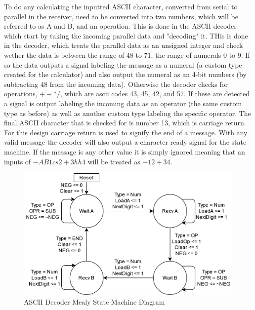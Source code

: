 \documentclass[11pt]{article}
\begin{document}
To do any calculating the inputted ASCII character, converted from serial to parallel in the receiver, need to be converted into two numbers, which will be referred to as A and B, and an operation.
This is done in the ASCII decoder which start by taking the incoming parallel data and "decoding" it.
THis is done in the decoder, which treats the parallel data as an unsigned integer and check wether the data is between the range of 48 to 71, the range of numerals 0 to 9.
If so the data outputs a signal labeling the message as a numeral (a custom type created for the calculator) and also output the numeral as an 4-bit numbers (by subtracting 48 from the incoming data).
Otherwise the decoder checks for operations, $+-*/$, which are ascii codes 43, 45, 42, and 57.
If these are detected a signal is output labeling the incoming data as an operator (the same custom type as before) as well as another custom type labeling the specific operator.
The final ASCII character that is checked for is number 13, which is carriage return.
For this design carriage return is used to signify the end of a message.
With any valid message the decoder will also output a character ready signal for the state machine.
If the message is any other value it is simply ignored meaning that an inputs of $-AB1cs 2 + 3 hh4$ will be treated as $-12+34$.

\begin{figure}[H]        
    \centering
    \includegraphics[width=.66\textwidth]{DecoderSM.drawio.png}
    \caption{ASCII Decoder Mealy State Machine Diagram}
    \label{fig:decodersm}
\end{figure} 
\end{document}
